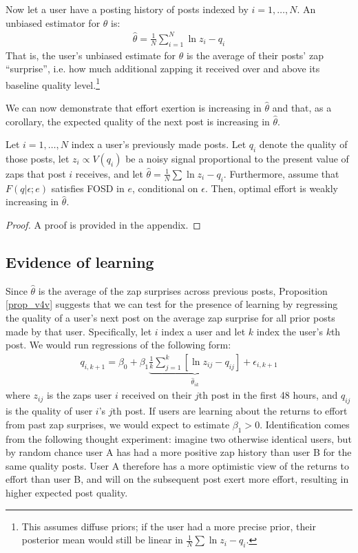 Now let a user have a posting history of posts indexed by $i=1,\ldots,N$. An unbiased estimator for $\theta$ is:
\begin{align}
\hat{\theta} = \frac{1}{N} \sum_{i=1}^N \ln z_i - q_i
\end{align}
That is, the user's unbiased estimate for $\theta$ is the average of their posts' zap ``surprise'', i.e. how much additional zapping it received over and above its baseline quality level.\footnote{This assumes diffuse priors; if the user had a more precise prior, their posterior mean would still be linear in $\frac{1}{N}\sum \ln z_i - q_i$.}

We can now demonstrate that effort exertion is increasing in $\hat{\theta}$ and that, as a corollary, the expected quality of the next post is increasing in $\hat{\theta}$.

\begin{proposition}\label{prop_v4v}
Let $i=1,\ldots,N$ index a user's previously made posts. Let $q_i$ denote the quality of those posts, let $z_i \propto V(q_i)$ be a noisy signal proportional to the present value of zaps that post $i$ receives, and let $\hat{\theta} = \frac{1}{N} \sum \ln z_i - q_i$. Furthermore, assume that $F(q | \epsilon;e)$ satisfies FOSD in $e$, conditional on $\epsilon$. Then, optimal effort is weakly increasing in $\hat{\theta}$.  
\end{proposition}

\begin{proof}
A proof is provided in the appendix.
\end{proof}

\subsection{Evidence of learning}

Since $\hat{\theta}$ is the average of the zap surprises across previous posts, Proposition \ref{prop_v4v} suggests that we can test for the presence of learning by regressing the quality of a user's next post on the average zap surprise for all prior posts made by that user. Specifically, let $i$ index a user and let $k$ index the user's $k$th post. We would run regressions of the following form:
\begin{align}
q_{i,k+1} = \beta_0 + \beta_1 \underbrace{\frac{1}{k} \sum_{j=1}^{k}\left[\ln z_{ij} - q_{ij}\right]}_{\hat{\theta}_{ik}} + \epsilon_{i,k+1} \label{eq_v4v_qreg}
\end{align}
where $z_{ij}$ is the zaps user $i$ received on their $j$th post in the first 48 hours, and $q_{ij}$ is the quality of user $i$'s $j$th post. If users are learning about the returns to effort from past zap surprises, we would expect to estimate $\beta_1 > 0$. Identification comes from the following thought experiment: imagine two otherwise identical users, but by random chance user A has had a more positive zap history than user B for the same quality posts. User A therefore has a more optimistic view of the returns to effort than user B, and will on the subsequent post exert more effort, resulting in higher expected post quality.

